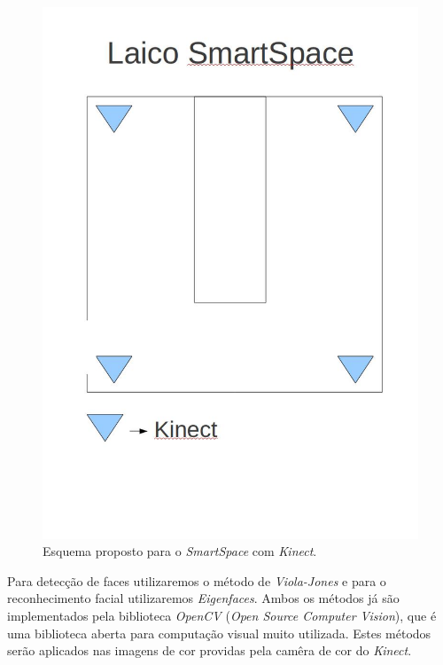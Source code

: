 	\begin{figure}[hbt]
		\begin{center}
			\includegraphics[scale=0.3]{figuras/4.ProblemaEProposta/esquemaSmartSpaceProposto.jpg}
		\end{center}
		\caption{Esquema proposto para o \textit{SmartSpace} com \textit{Kinect}.}
		\label{smartSpaceProposto}
	\end{figure}

	Para detecção de faces utilizaremos o método de \textit{Viola-Jones} e para o reconhecimento facial utilizaremos \textit{Eigenfaces}. Ambos os métodos já são implementados pela biblioteca \textit{OpenCV} (\textit{Open Source Computer Vision}), que é uma biblioteca aberta para computação visual muito utilizada. Estes métodos serão aplicados nas imagens de cor providas pela camêra de cor do \textit{Kinect}.

